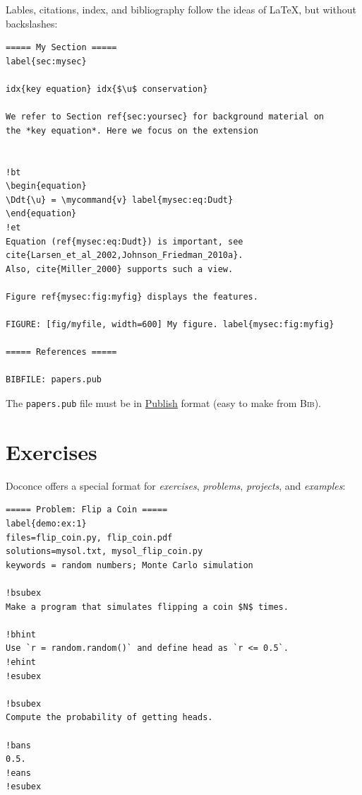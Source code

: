 \documentclass[%
twoside,                 %
final,                   %
chapterprefix=true,      %
open=right               %
10pt]{book}
\begin{document}
Lables, citations, index, and bibliography follow the ideas of
{\LaTeX}, but without backslashes:

\begin{Verbatim}[numbers=none,fontsize=\fontsize{9pt}{9pt},baselinestretch=0.95]
===== My Section =====
label{sec:mysec}

idx{key equation} idx{$\u$ conservation}

We refer to Section ref{sec:yoursec} for background material on
the *key equation*. Here we focus on the extension


!bt
\begin{equation}
\Ddt{\u} = \mycommand{v} label{mysec:eq:Dudt}
\end{equation}
!et
Equation (ref{mysec:eq:Dudt}) is important, see
cite{Larsen_et_al_2002,Johnson_Friedman_2010a}.
Also, cite{Miller_2000} supports such a view.

Figure ref{mysec:fig:myfig} displays the features.

FIGURE: [fig/myfile, width=600] My figure. label{mysec:fig:myfig}

===== References =====

BIBFILE: papers.pub
\end{Verbatim}
The \Verb!papers.pub! file must be in \href{{https://bitbucket.org/logg/publish}}{Publish}
format (easy to make from \textsc{Bib}\negthinspace{\TeX}).

\section*{Exercises}

Doconce offers a special format for \emph{exercises}, \emph{problems}, \emph{projects},
and \emph{examples}:

\begin{Verbatim}[numbers=none,fontsize=\fontsize{9pt}{9pt},baselinestretch=0.95]
===== Problem: Flip a Coin =====
label{demo:ex:1}
files=flip_coin.py, flip_coin.pdf
solutions=mysol.txt, mysol_flip_coin.py
keywords = random numbers; Monte Carlo simulation

!bsubex
Make a program that simulates flipping a coin $N$ times.

!bhint
Use `r = random.random()` and define head as `r <= 0.5`.
!ehint
!esubex

!bsubex
Compute the probability of getting heads.

!bans
0.5.
!eans
!esubex
\end{Verbatim}
\end{document}
